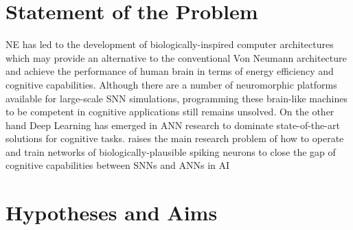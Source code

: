 \section{Statement of the Problem}
\label{sec:state_problem}
NE has led to the development of biologically-inspired computer architectures which may provide an alternative to the conventional Von Neumann architecture and achieve the performance of \protect{} human brain in terms of energy efficiency and cognitive capabilities.
Although there are a number of neuromorphic platforms available for large-scale SNN simulations, programming these brain-like machines to be competent in cognitive applications still remains unsolved.
On the other hand Deep Learning has emerged in ANN research to dominate state-of-the-art solutions for cognitive tasks.
\protect{}
\protect{} raises the main research problem of how to operate and train networks of biologically-plausible spiking neurons to close the gap of cognitive capabilities between SNNs and ANNs in AI \protect{} \protect{}



\section{Hypotheses and Aims}
\label{sec:aim}


